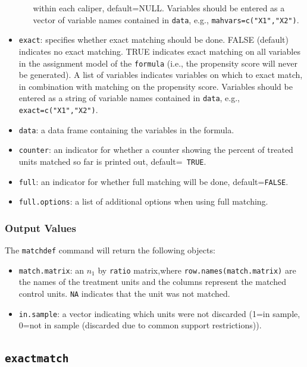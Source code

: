 \documentclass[oneside,letterpaper,titlepage]{article}
\begin{document}
\begin{appendix}
\begin{itemize}
\begin{itemize}
    within each caliper, default=NULL.  Variables should be entered as
    a vector of variable names contained in \texttt{data}, e.g.,
    \texttt{mahvars=c("X1","X2")}.
  \end{itemize}
\item \texttt{exact}: specifies whether exact matching should be done.
  FALSE (default) indicates no exact matching.  TRUE indicates exact
  matching on all variables in the assignment model of the
  \texttt{formula} (i.e., the propensity score will never be
  generated).  A list of variables indicates variables on which to
  exact match, in combination with matching on the propensity score.
  Variables should be entered as a string of variable names contained
  in \texttt{data}, e.g., \texttt{exact=c("X1","X2")}.
\item \texttt{data}: a data frame containing the variables in the
  formula.
\item \texttt{counter}: an indicator for whether a counter showing the
  percent of treated units matched so far is printed out, default={\tt
    TRUE}.
\item \texttt{full}: an indicator for whether full matching will be done, default={\texttt{FALSE}}.
\item \texttt{full.options}: a list of additional options when using full matching.
\end{itemize}


\subsubsection{Output Values}
The \texttt{matchdef} command will return the following objects:

\begin{itemize}
\item \texttt{match.matrix}: an $n_1$ by \texttt{ratio} matrix,where
  \texttt{row.names(match.matrix)} are the names of the
  treatment units and the columns represent the matched control units.
  \texttt{NA} indicates that the unit was not matched.
\item \texttt{in.sample}: a vector indicating which units were not discarded
  (1=in sample, 0=not in sample (discarded due to common support
  restrictions)).
\end{itemize}

\subsection{\texttt{exactmatch}}


\end{appendix}
\end{document}
